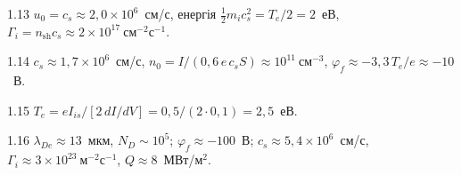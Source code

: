 \begin{Solution}{1.{13}}
		$u_0=c_s\approx2{,}0\times10^{6}$~см/с, енергія $\tfrac12m_ic_s^2=T_e/2=2$~еВ,
	$\Gamma_i=n_\mathrm{sh}c_s\approx2\times10^{17}~\mathrm{см}^{-2}\mathrm{с}^{-1}$.
	
\end{Solution}
\begin{Solution}{1.{14}}
		$c_s\approx1{,}7\times10^{6}$~см/с, $n_0=I/(0{,}6\,e\,c_sS)\approx10^{11}~\mathrm{см}^{-3}$,
	$\varphi_f\approx-3{,}3\,T_e/e\approx-10$~В.
	
\end{Solution}
\begin{Solution}{1.{15}}
		$T_e=eI_{is}/[2\,dI/dV]=0{,}5/(2\cdot0{,}1)=2{,}5$~еВ.
	
\end{Solution}
\begin{Solution}{1.{16}}
		$\lambda_{De}\approx13$~мкм, $N_D\sim10^5$; $\varphi_f\approx-100$~В;
	$c_s\approx5{,}4\times10^6$~см/с, $\Gamma_i\approx3\times10^{23}~\mathrm{м}^{-2}\mathrm{с}^{-1}$,
	$Q\approx8$~МВт/м$^2$.
	
\end{Solution}
